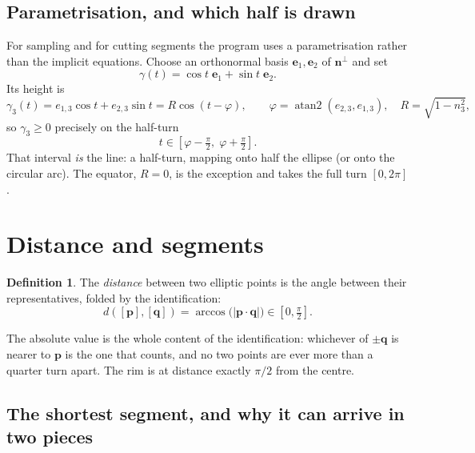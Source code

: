 \documentclass[11pt,a4paper]{article}
\newcommand{\nvec}{\mathbf{n}}
\newcommand{\ee}{\mathbf{e}}
\newcommand{\pp}{\mathbf{p}}
\newcommand{\qq}{\mathbf{q}}
\newcommand{\abs}[1]{\lvert #1 \rvert}
\theoremstyle{plain}
\theoremstyle{definition}
\newtheorem{definition}[proposition]{Definition}
\theoremstyle{remark}
\begin{document}
\subsection{Parametrisation, and which half is drawn}

For sampling and for cutting segments the program uses a parametrisation rather
than the implicit equations. Choose an orthonormal basis $\ee_1,\ee_2$ of
$\nvec^{\perp}$ and set
\begin{equation}
  \label{eq:arc-param}
  \gamma(t)=\cos t\;\ee_1+\sin t\;\ee_2 .
\end{equation}
Its height is
\begin{equation}
  \label{eq:height}
  \gamma_3(t)=e_{1,3}\cos t+e_{2,3}\sin t=R\cos(t-\varphi),
  \qquad
  \varphi=\operatorname{atan2}(e_{2,3},e_{1,3}),\quad R=\sqrt{1-n_3^2},
\end{equation}
so $\gamma_3\ge0$ precisely on the half-turn
\begin{equation}
  \label{eq:line-range}
  t\in[\varphi-\tfrac{\pi}{2},\;\varphi+\tfrac{\pi}{2}] .
\end{equation}
That interval \emph{is} the line: a half-turn, mapping onto half the ellipse (or
onto the circular arc). The equator, $R=0$, is the exception and takes the full
turn $[0,2\pi]$.

\section{Distance and segments}

\begin{definition}
The \emph{distance} between two elliptic points is the angle between their
representatives, folded by the identification:
\begin{equation}
  \label{eq:distance}
  d([\pp],[\qq])=\arccos\bigl(\abs{\pp\cdot\qq}\bigr)\in[0,\tfrac{\pi}{2}].
\end{equation}
\end{definition}

The absolute value is the whole content of the identification: whichever of
$\pm\qq$ is nearer to $\pp$ is the one that counts, and no two points are ever
more than a quarter turn apart. The rim is at distance exactly $\pi/2$ from the
centre.

\subsection{The shortest segment, and why it can arrive in two pieces}
\end{document}
